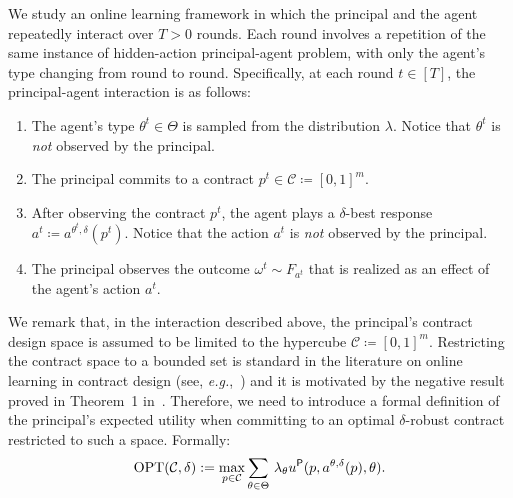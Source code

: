 We study an online learning framework in which the principal and the agent repeatedly interact over $T > 0$ rounds.
%
Each round involves a repetition of the same instance of hidden-action principal-agent problem, with only the agent's type changing from round to round. 
%
Specifically, at each round $t \in [T]$, the principal-agent interaction is as follows:
%
\begin{enumerate}
	\item The agent's type $\theta^t \in \Theta$ is sampled from the distribution $\lambda$. Notice that $\theta^t$ is \emph{not} observed by the principal.
	\item The principal commits to a contract $p^t \in \mathcal{C} \coloneqq [0,1]^m$.
	\item After observing the contract $p^t$, the agent plays a $\delta$-best response $a^t\coloneqq a^{\theta^t,\delta}(p^t)$.
	Notice that the action $a^{t}$ is \emph{not} observed by the principal. 
	\item The principal observes the outcome $\omega^t \sim {F}_{a^{t}}$ that is realized as an effect of the agent's action $a^t$.
\end{enumerate}
%
We remark that, in the interaction described above, the principal's contract design space is assumed to be limited to the hypercube $\mathcal{C} \coloneqq [0,1]^m$.
%
Restricting the contract space to a bounded set is standard in the literature on online learning in contract design (see, \emph{e.g.},~\cite{ho2015adaptive,Zhu2023Sample,chen2024bounded}) and it is motivated by the negative result proved in Theorem~1 in~\citep{bacchiocchilearning}.
%
Therefore, we need to introduce a formal definition of the principal's expected utility when committing to an optimal $\delta$-robust contract restricted to such a space.
%
Formally:
%
$$
%
\textnormal{OPT}(\mathcal{C}, \delta) := \max_{p \in \mathcal{C}} \sum_{\theta \in \Theta} \, \lambda_\theta u^\sfP(p, a^{\theta,\delta}(p), \theta).
$$



